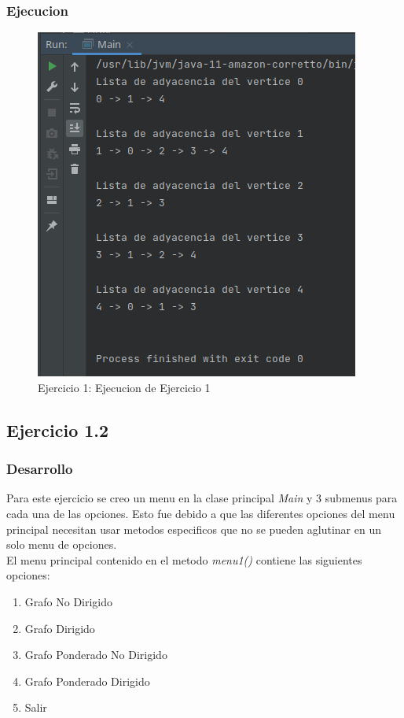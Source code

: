 \documentclass{article}
\begin{document}
			\subsubsection{Ejecucion}
				\begin{figure}[H]
					\centering
					\includegraphics[scale=0.8]{images/e1.png}
					\caption*{Ejercicio 1: Ejecucion de Ejercicio 1}
				\end{figure}
		\newpage
		
		\subsection{Ejercicio 1.2}
		
			\subsubsection{Desarrollo}
			
				Para este ejercicio se creo un menu en la clase principal \emph{Main} y 3 submenus para cada una de las opciones. Esto fue debido a que las diferentes opciones del menu principal necesitan usar metodos especificos que no se pueden aglutinar en un solo menu de opciones.\\
				
				El menu principal contenido en el metodo \emph{menu1()} contiene las siguientes opciones:
				
				\begin{enumerate}
					\item Grafo No Dirigido
					\item Grafo Dirigido
					\item Grafo Ponderado No Dirigido
					\item Grafo Ponderado Dirigido
					\item Salir
				\end{enumerate}
			
\end{document}
